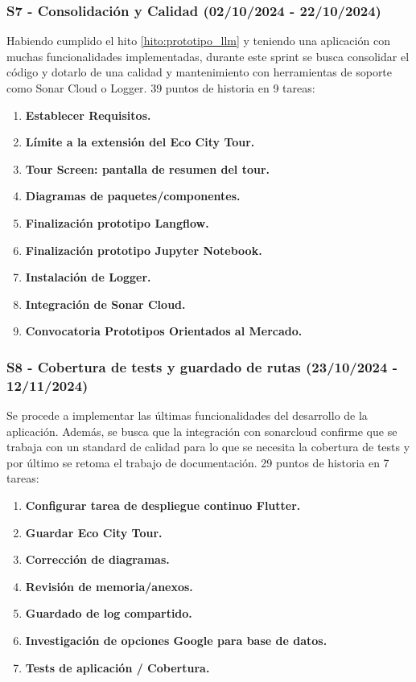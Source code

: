 \subsubsection{S7 - Consolidación y Calidad (02/10/2024 - 22/10/2024)} Habiendo cumplido el hito \ref{hito:prototipo_llm} y teniendo una aplicación con muchas funcionalidades implementadas, durante este sprint se busca consolidar el código y dotarlo de una calidad y mantenimiento con herramientas de soporte como Sonar Cloud o Logger. 39 puntos de historia en 9 tareas:
\begin{enumerate}
	\item \textbf{Establecer Requisitos.}
	\item \textbf{Límite a la extensión del Eco City Tour.}
	\item \textbf{Tour Screen: pantalla de resumen del tour.}
	\item \textbf{Diagramas de paquetes/componentes.}
	\item \textbf{Finalización prototipo Langflow.}
	\item \textbf{Finalización prototipo Jupyter Notebook.}
	\item \textbf{Instalación de Logger.}
	\item \textbf{Integración de Sonar Cloud.}
	\item \textbf{Convocatoria Prototipos Orientados al Mercado.}
\end{enumerate}

\subsubsection{S8 - Cobertura de tests y guardado de rutas (23/10/2024 - 12/11/2024)}
Se procede a implementar las últimas funcionalidades del desarrollo de la aplicación. Además, se busca que la integración con sonarcloud confirme que se trabaja con un standard de calidad para lo que se necesita la cobertura de tests y por último se retoma el trabajo de documentación. 29 puntos de historia en 7 tareas:
\begin{enumerate}
	\item \textbf{Configurar tarea de despliegue continuo Flutter.}
	\item \textbf{Guardar Eco City Tour.}
	\item \textbf{Corrección de diagramas.}
	\item \textbf{Revisión de memoria/anexos.}
	\item \textbf{Guardado de log compartido.}
	\item \textbf{Investigación de opciones Google para base de datos.}
	\item \textbf{Tests de aplicación / Cobertura.}
\end{enumerate}

